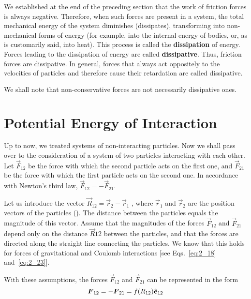 We established at the end of the preceding section that the work of friction forces is always negative. Therefore, when such forces are present in a system, the total mechanical energy of the system diminishes (dissipates), transforming into non-mechanical forms of energy (for example, into the internal energy of bodies, or, as is customarily said, into heat). This process is called the \textbf{dissipation} of energy. Forces leading to the dissipation of energy are called \textbf{dissipative}. Thus, friction forces are dissipative. In general, forces that always act oppositely to the velocities of particles and therefore cause their retardation are called dissipative.

We shall note that non-conservative forces are not necessarily dissipative ones.

\section{Potential Energy of Interaction}\label{sec:3_6}

Up to now, we treated systems of non-interacting particles. Now we shall pass over to the consideration of a system of two particles interacting with each other. Let $\vec{F}_{12}$ be the force with which the second particle acts on the first one, and $\vec{F}_{21}$ be the force with which the first particle acts on the second one. In accordance with Newton's third law, $\vec{F}_{12}=-\vec{F}_{21}$.


Let us introduce the vector $\vec{R}_{12}=\vec{r}_2-\vec{r}_1$ , where $\vec{r}_1$ and $\vec{r}_2$ are the position vectors of the particles (). The distance between the particles equals the magnitude of this vector. Assume that the magnitudes of the forces $\vec{F}_{12}$ and $\vec{F}_{21}$ depend only on the distance $\vec{R}{12}$ between the particles, and that the forces are directed along the straight line connecting the particles. We know that this holds for forces of gravitational and Coulomb interactions [see Eqs.~\eqref{eq:2_18} and~\eqref{eq:2_23}].

With these assumptions, the forces $\vec{F}_{12}$ and $\vec{F}_{21}$ can be represented in the form
\vspace{-12pt}
\begin{equation}\label{eq:3_41}
\boldsymbol{F}_{12} = -\boldsymbol{F}_{21} = f(R_{12})\hat{\boldsymbol{e}}_{12}
\end{equation}

